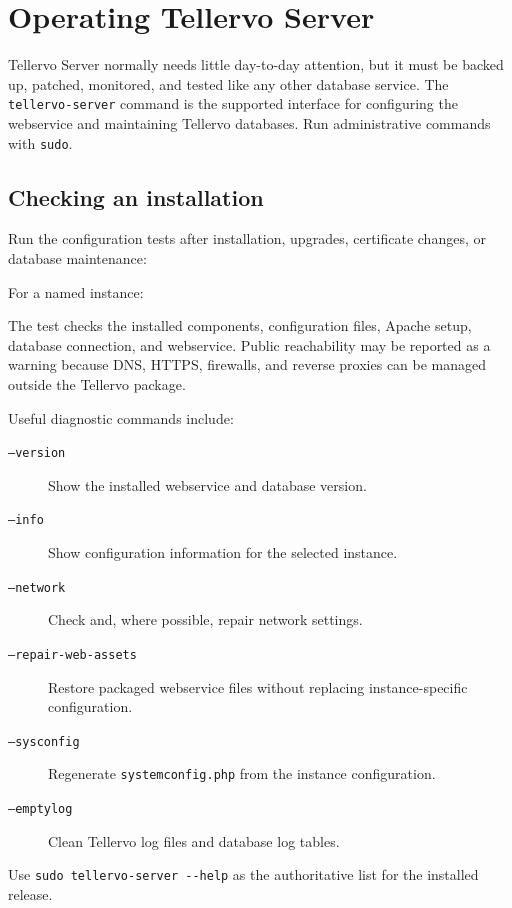 \chapter{Operating Tellervo Server}
\label{txt:runningserver}

Tellervo Server normally needs little day-to-day attention, but it must be
backed up, patched, monitored, and tested like any other database service. The
\verb|tellervo-server| command is the supported interface for configuring the
webservice and maintaining Tellervo databases. Run administrative commands with
\verb|sudo|.

\section{Checking an installation}

Run the configuration tests after installation, upgrades, certificate changes,
or database maintenance:


For a named instance:


The test checks the installed components, configuration files, Apache setup,
database connection, and webservice. Public reachability may be reported as a
warning because DNS, HTTPS, firewalls, and reverse proxies can be managed
outside the Tellervo package.

Useful diagnostic commands include:

\begin{description}
 \item[\texttt{--version}] Show the installed webservice and database version.
 \item[\texttt{--info}] Show configuration information for the selected
 instance.
 \item[\texttt{--network}] Check and, where possible, repair network settings.
 \item[\texttt{--repair-web-assets}] Restore packaged webservice files without
 replacing instance-specific configuration.
 \item[\texttt{--sysconfig}] Regenerate \verb|systemconfig.php| from the
 instance configuration.
 \item[\texttt{--emptylog}] Clean Tellervo log files and database log tables.
\end{description}

Use \verb|sudo tellervo-server --help| as the authoritative list for the
installed release.

